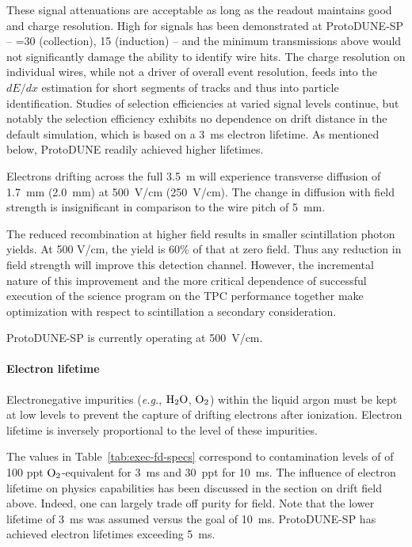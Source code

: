 These signal attenuations are acceptable as long as the readout 
maintains good  and charge resolution.  High  for 
 signals has been demonstrated at ProtoDUNE-SP -- =30 
(collection), 15 (induction) -- and the minimum transmissions 
above would not significantly damage the ability to identify 
wire hits.  The charge resolution on individual wires, while not 
a driver of overall event resolution, feeds into the $dE/dx$ 
estimation for short segments of tracks and thus into 
particle identification.  Studies of selection efficiencies at 
varied signal levels continue, but notably the \nue 
selection efficiency exhibits no dependence on drift 
distance in the default simulation, which is based on a 
3~ms electron lifetime.  As mentioned below, ProtoDUNE readily 
achieved higher lifetimes.

Electrons drifting across the full 3.5~m will experience 
transverse diffusion of 1.7~mm (2.0~mm) at 500~V/cm (250~V/cm).  
The change in diffusion with field strength is insignificant in comparison to the wire pitch of 5~mm.

The reduced recombination at higher field results in 
smaller scintillation photon yields.  At 500 V/cm, the 
yield is 60\% of that at zero field.  Thus any reduction 
in field strength will improve this detection channel.  
However, the incremental nature of this improvement and 
the more critical dependence of successful execution of 
the science program on the TPC performance together make
optimization with respect to scintillation a secondary consideration.

ProtoDUNE-SP is currently operating at 500~V/cm.

\paragraph{Electron lifetime}
Electronegative impurities ({\em e.g.}, $\rm{H}_{2}\rm{O}$, $\rm{O}_{2}$) within the liquid argon must be kept at 
low levels to prevent the capture of drifting electrons after ionization.  Electron lifetime is inversely proportional to the level of these impurities.

The values in Table~\ref{tab:exec-fd-specs} correspond to 
contamination levels of of 100 ppt $\rm{O}_2$-equivalent 
for 3~ms and 30~ppt for 10~ms.  The influence of electron 
lifetime on physics capabilities has been discussed in the 
section on drift field above.  
Indeed, one can largely trade off purity for field. 
Note that the lower lifetime of 3~ms was assumed %
versus the goal of 10~ms.  ProtoDUNE-SP has achieved electron lifetimes exceeding 5~ms.

